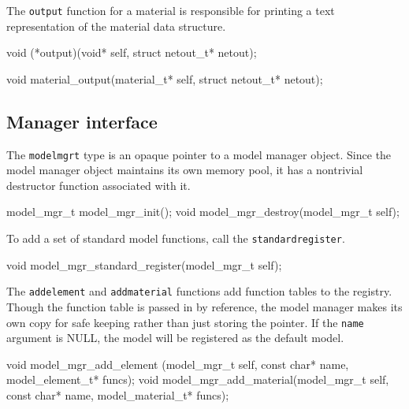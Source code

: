 The {\tt{}output} function for a material is responsible for printing
a text representation of the material data structure.

\nwenddocs{}\plusendmoddef
void (*output)(void* self, struct netout_t* netout);
\nwendcode{}\nwdocspar

\nwenddocs{}\plusendmoddef
void material_output(material_t* self, struct netout_t* netout);
\nwendcode{}\nwdocspar


\subsection{Manager interface}

The {\tt{}model{}mgr{}t} type is an opaque pointer to a model manager
object.  Since the model manager object maintains its own memory
pool, it has a nontrivial destructor function associated with it.

\nwenddocs{}\plusendmoddef
model_mgr_t model_mgr_init();
void        model_mgr_destroy(model_mgr_t self);

\nwendcode{}\nwdocspar

To add a set of standard model functions, call the {\tt{}standard{}register}.

\nwenddocs{}\plusendmoddef
void        model_mgr_standard_register(model_mgr_t self);
\nwendcode{}\nwdocspar

The {\tt{}add{}element} and {\tt{}add{}material} functions add function
tables to the registry.  Though the function table is passed in
by reference, the model manager makes its own copy for safe
keeping rather than just storing the pointer.  If the {\tt{}name}
argument is NULL, the model will be registered as the default model.

\nwenddocs{}\plusendmoddef
void model_mgr_add_element (model_mgr_t self, const char* name, 
                            model_element_t*  funcs);
void model_mgr_add_material(model_mgr_t self, const char* name, 
                            model_material_t* funcs);

